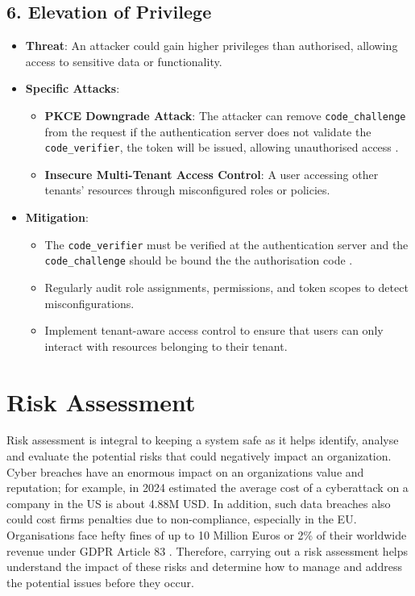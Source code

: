 \subsection*{6. Elevation of Privilege}
\begin{itemize}
    \item \textbf{Threat}: An attacker could gain higher privileges than authorised, allowing access to sensitive data or functionality.
    \item \textbf{Specific Attacks}:
    \begin{itemize}
        \item \textbf{PKCE Downgrade Attack}: The attacker can remove \texttt{code\_challenge} from the request if the authentication server does not validate the \texttt{code\_verifier}, the token will be issued, allowing unauthorised access \citep{oidc_attacks}.
        \item \textbf{Insecure Multi-Tenant Access Control}: A user accessing other tenants' resources through misconfigured roles or policies.
    \end{itemize}
    \item \textbf{Mitigation}:
    \begin{itemize}
        \item The \texttt{code\_verifier} must be verified at the authentication server and the \texttt{code\_challenge} should be bound the the authorisation code \citep{oidc_attacks}.
        \item Regularly audit role assignments, permissions, and token scopes to detect misconfigurations.
        \item Implement tenant-aware access control to ensure that users can only interact with resources belonging to their tenant.
    \end{itemize}
\end{itemize}


\section{Risk Assessment}
Risk assessment is integral to keeping a system safe as it helps identify, analyse and evaluate the potential risks that could negatively impact an organization. Cyber breaches have an enormous impact on an organizations value and reputation; for example, in 2024 \citep{ibm} estimated the average cost of a cyberattack on a company in the US is about 4.88M USD. In addition, such data breaches also could cost firms penalties due to non-compliance, especially in the EU. Organisations face hefty fines of up to 10 Million Euros or 2\% of their worldwide revenue under GDPR Article 83 \citep{gdpr_fine}. Therefore, carrying out a risk assessment helps understand the impact of these risks and determine how to manage and address the potential issues before they occur. 

